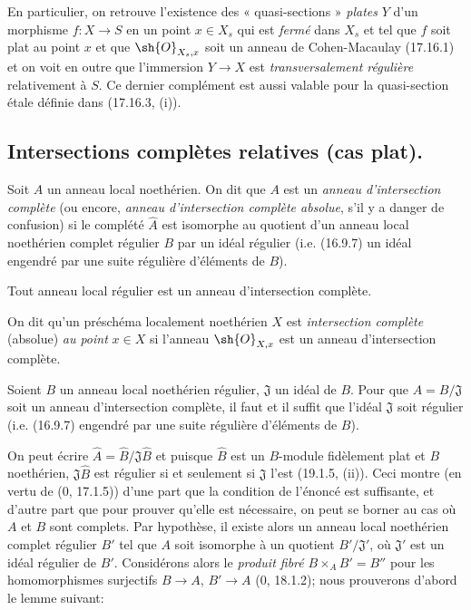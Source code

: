 En particulier, on retrouve l'existence des « quasi-sections » \emph{plates} $Y$ d'un morphisme $f:X\to S$ en un point $x\in X_s$ qui est \emph{fermé} dans $X_s$ et tel que $f$ soit plat au point $x$ et que $\sh{O}_{X_s,x}$ soit un anneau de Cohen-Macaulay (17.16.1) et on voit en outre que l'immersion $Y\to X$ est \emph{transversalement régulière} relativement à $S$. Ce dernier complément est aussi valable pour la quasi-section étale définie dans (17.16.3, (i)).

\subsection{Intersections complètes relatives (cas plat).}


\begin{definition}[19.3.1]
Soit $A$ un anneau local noethérien. On dit que $A$ est un \emph{anneau d'intersection complète} (ou encore, \emph{anneau d'intersection complète absolue}, s'il y a danger de confusion) si le complété $\widehat A$ est isomorphe au quotient d'un anneau local noethérien complet régulier $B$ par un idéal régulier (i.e. (16.9.7) un idéal engendré par une suite régulière d'éléments de $B$).

Tout anneau local régulier est un anneau d'intersection complète.

On dit qu'un préschéma localement noethérien $X$ est \emph{intersection complète} (absolue) \emph{au point} $x\in X$ si l'anneau $\sh{O}_{X,x}$ est un anneau d'intersection complète.
\end{definition}

\begin{proposition}[19.3.2]
\label{IV.19.3.2}
Soient $B$ un anneau local noethérien régulier, $\mathfrak J$ un idéal de $B$. Pour que $A=B/\mathfrak J$ soit un anneau d'intersection complète, il faut et il suffit que l'idéal $\mathfrak J$ soit régulier (i.e. (16.9.7) engendré par une suite régulière d'éléments de $B$).
\end{proposition}

On peut écrire $\widehat A=\widehat B/\mathfrak J\widehat B$ et puisque $\widehat B$ est un $B$-module fidèlement plat et $B$ noethérien, $\mathfrak J\widehat B$ est régulier si et seulement si $\mathfrak J$ l'est (19.1.5, (ii)). Ceci montre (en vertu de ($0$, 17.1.5)) d'une part que la condition de l'énoncé est suffisante, et d'autre part que pour prouver qu'elle est nécessaire, on peut se borner au cas où $A$ et $B$ sont complets. Par hypothèse, il existe alors un anneau local noethérien complet régulier $B'$ tel que $A$ soit isomorphe à un quotient $B'/\mathfrak J'$, où $\mathfrak J'$ est un idéal régulier de $B'$. Considérons alors le \emph{produit fibré} $B\times_A B'=B''$ pour les homomorphismes surjectifs $B\to A$, $B'\to A$ ($0$, 18.1.2); nous prouverons d'abord le lemme suivant:

